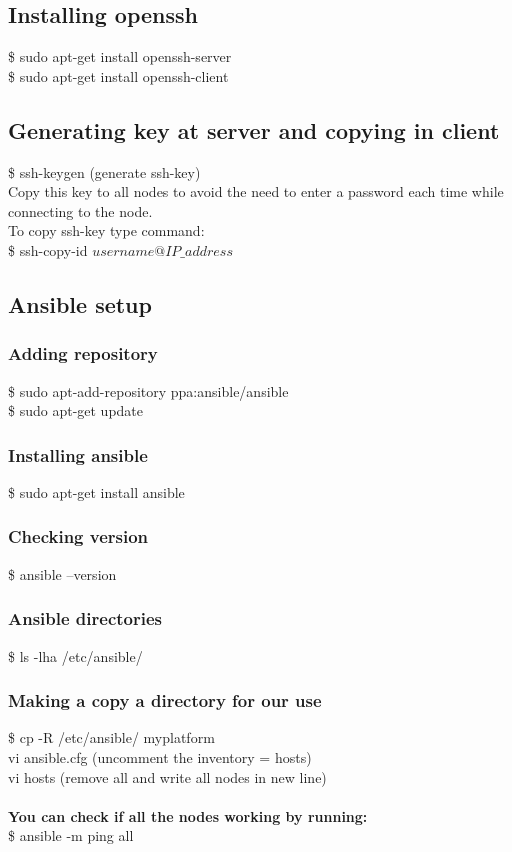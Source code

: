 \documentclass[12pt]{report}
\begin{document}
\subsection{Installing openssh}
\$ sudo apt-get install openssh-server\\
\$ sudo apt-get install openssh-client
\subsection{Generating key at server and copying in client}
\$ ssh-keygen (generate ssh-key)\\
Copy this key to all nodes to avoid the need to enter a password each time while connecting to the node.\\
To copy ssh-key type command:\\
\$ ssh-copy-id $username@IP\_address$
\subsection{Ansible setup}
\subsubsection{Adding repository}
\$ sudo apt-add-repository ppa:ansible/ansible\\
\$ sudo apt-get update
\subsubsection{Installing ansible}
\$ sudo apt-get install ansible
\subsubsection{Checking version}
\$ ansible  --version
\subsubsection{Ansible directories}
\$ ls -lha /etc/ansible/
\subsubsection{Making a copy a directory for our use}
\$ cp -R /etc/ansible/ myplatform\\
vi ansible.cfg (uncomment the inventory =  hosts)\\
vi hosts (remove all and write all nodes in new line)\\\\
\textbf{You can check if all the nodes working by running:}\\
\$ ansible -m ping all
\end{document}
